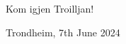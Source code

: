 \\ %
\\
Kom igjen Troilljan!
\vspace*{\fill}
\begin{flushleft}
    Trondheim, 7th June 2024
    \hfill
\end{flushleft}